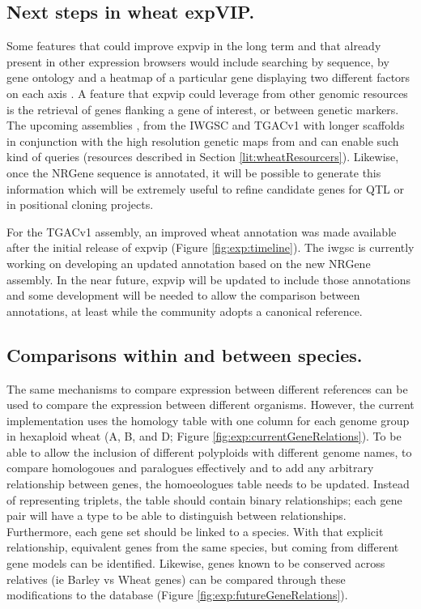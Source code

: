 \subsection{Next steps in wheat expVIP.}
Some features that could improve \gls{expvip} in the long term and that already present in other expression browsers would include searching by sequence, by gene ontology and a heatmap of a particular gene displaying two different factors on each axis . 
A feature that \gls{expvip} could leverage from other genomic resources is the retrieval of genes flanking a gene of interest, or between genetic markers. 
The upcoming assemblies , from the IWGSC \citep{Clark2016} and TGACv1 \citep{Pozniak2016}  with longer scaffolds in conjunction with the high resolution genetic maps from \citet{Wang2014} and \citet{Chapman2015} can enable such kind of queries (resources described in Section \ref{lit:wheatResourcers}). 
Likewise, once the NRGene sequence is annotated, it will be possible to generate this information which will be extremely useful to refine candidate genes for QTL or in positional cloning projects. 

For the TGACv1 assembly, an improved wheat annotation was made available after the initial release of \gls{expvip} (Figure \ref{fig:exp:timeline}). 
The \gls{iwgsc} is currently working on developing an updated annotation based on the new NRGene assembly. 
In the near future, \gls{expvip} will be updated to include those annotations and some development will be needed to allow the comparison between annotations, at least while the community adopts a canonical reference. 

\subsection{Comparisons within and between species.}
The same mechanisms to compare expression between different references can be used to compare the expression between different organisms. 
However, the current implementation uses the homology table with one column for each genome group in hexaploid wheat (A, B, and D; Figure \ref{fig:exp:currentGeneRelations}). 
To be able to allow the inclusion of different polyploids with different genome names, to compare homologoues and paralogues effectively and to add any arbitrary relationship between genes, the homoeologues table needs to be updated. 
Instead of representing triplets, the table should contain binary relationships; each gene pair will have a type to be able to distinguish between relationships. 
Furthermore, each gene set should be linked to a species. 
With that explicit relationship, equivalent genes from the same species, but coming from different gene models can be identified. 
Likewise, genes known to be conserved across relatives (ie Barley vs Wheat genes) can be compared through these modifications to the database (Figure \ref{fig:exp:futureGeneRelations}).  

